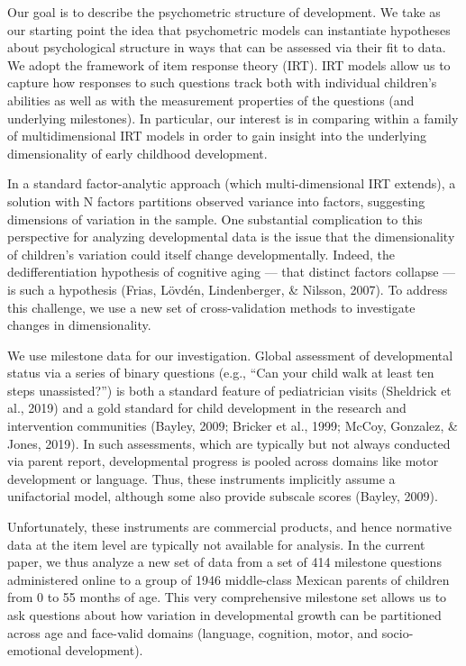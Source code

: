\documentclass[10pt, letterpaper]{article}
\begin{document}
Our goal is to describe the psychometric structure of development. We
take as our starting point the idea that psychometric models can
instantiate hypotheses about psychological structure in ways that can be
assessed via their fit to data. We adopt the framework of item response
theory (IRT). IRT models allow us to capture how responses to such
questions track both with individual children's abilities as well as
with the measurement properties of the questions (and underlying
milestones). In particular, our interest is in comparing within a family
of multidimensional IRT models in order to gain insight into the
underlying dimensionality of early childhood development.

In a standard factor-analytic approach (which multi-dimensional IRT
extends), a solution with N factors partitions observed variance into
factors, suggesting dimensions of variation in the sample. One
substantial complication to this perspective for analyzing developmental
data is the issue that the dimensionality of children's variation could
itself change developmentally. Indeed, the dedifferentiation hypothesis
of cognitive aging --- that distinct factors collapse --- is such a
hypothesis (Frias, Lövdén, Lindenberger, \& Nilsson, 2007). To address
this challenge, we use a new set of cross-validation methods to
investigate changes in dimensionality.

We use milestone data for our investigation. Global assessment of
developmental status via a series of binary questions (e.g., ``Can your
child walk at least ten steps unassisted?'') is both a standard feature
of pediatrician visits (Sheldrick et al., 2019) and a gold standard for
child development in the research and intervention communities (Bayley,
2009; Bricker et al., 1999; McCoy, Gonzalez, \& Jones, 2019). In such
assessments, which are typically but not always conducted via parent
report, developmental progress is pooled across domains like motor
development or language. Thus, these instruments implicitly assume a
unifactorial model, although some also provide subscale scores (Bayley,
2009).

Unfortunately, these instruments are commercial products, and hence
normative data at the item level are typically not available for
analysis. In the current paper, we thus analyze a new set of data from a
set of 414 milestone questions administered online to a group of 1946
middle-class Mexican parents of children from 0 to 55 months of age.
This very comprehensive milestone set allows us to ask questions about
how variation in developmental growth can be partitioned across age and
face-valid domains (language, cognition, motor, and socio-emotional
development).
\end{document}
